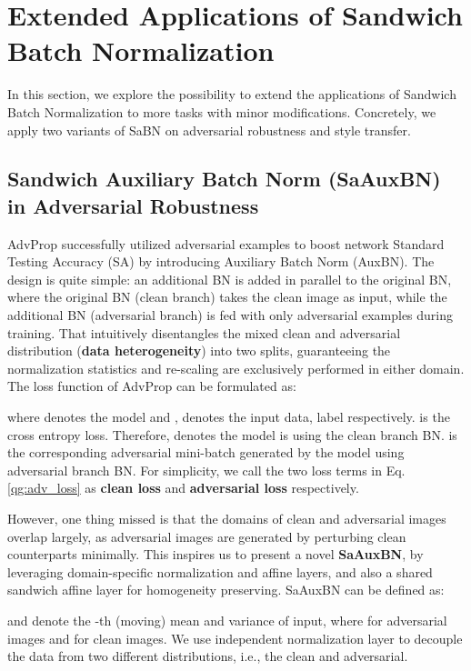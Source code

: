\documentclass{article}
\begin{document}
  \section{Extended Applications of Sandwich Batch Normalization}
In this section, we explore the possibility to extend the applications of Sandwich Batch Normalization to more tasks with minor modifications. Concretely, we apply two variants of SaBN on adversarial robustness and style transfer.
\subsection{Sandwich Auxiliary Batch Norm (SaAuxBN) in Adversarial Robustness} 
AdvProp \citep{xie2019adversarial} successfully utilized adversarial examples to boost network Standard Testing Accuracy (SA) by introducing Auxiliary Batch Norm (AuxBN). The design is quite simple: an additional BN is added in parallel to the original BN, where the original BN (clean branch) takes the clean image as input, while the additional BN (adversarial branch) is fed with only adversarial examples during training. That intuitively disentangles the mixed clean and adversarial distribution (\textbf{data heterogeneity}) into two splits, guaranteeing the normalization statistics and re-scaling are exclusively performed in either domain. The loss function of AdvProp can be formulated as:

where  denotes the model and ,  denotes the input data, label respectively.  is the cross entropy loss. Therefore,  denotes the model is using the clean branch BN.  is the corresponding adversarial mini-batch generated by the model using adversarial branch BN. For simplicity, we call the two loss terms in Eq. \ref{qg:adv_loss} as \textbf{clean loss} and \textbf{adversarial loss} respectively.

However, one thing missed is that the domains of clean and adversarial images overlap largely, as adversarial images are generated by perturbing clean counterparts minimally. This inspires us to present a novel \textbf{SaAuxBN}, by leveraging domain-specific normalization and affine layers, and also a shared sandwich affine layer for homogeneity preserving. SaAuxBN can be defined as:

\vspace{-2pt}
 and  denote the -th (moving) mean and variance of input, where  for adversarial images and  for clean images. We use independent normalization layer to decouple the data from two different distributions, i.e., the clean and adversarial. 
\end{document}
